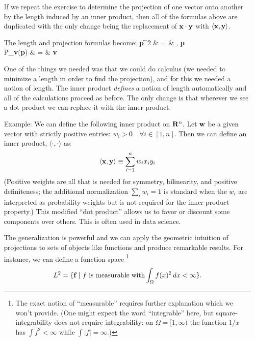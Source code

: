 \documentclass[12pt]{article}
\begin{document}
If we repeat the exercise to determine the projection of one vector onto 
another by the length induced by an inner product, then all of the 
formulas above are duplicated with the only change being the replacement 
of ${\bf x} \cdot {\bf y}$ with $\langle{\bf x}, {\bf y}\rangle$.

The length and projection formulas become:
\be
  \|{\bf p}\|^2 & = & , {\bf p} \rangle \\
  P_{\bf v}({\bf p}) & = &  {\bf v}
\ee

One of the things we needed was that we could do calculus
(we needed to minimize a length in order to find the projection),
and for this we needed a notion of length. The inner product {\em defines\/} 
a notion of length automatically and all of the calculations proceed as before.
The only change is that wherever we see a dot product we can replace it with 
the inner product.

Example: We can define the following inner product on ${\bf R}^n$.
Let ${\bf w}$ be a given vector with strictly positive entries:
$w_i > 0 \quad \forall i \in [1, n]$.
Then we can define an inner product, $\langle \cdot, \cdot \rangle$ as:
$$ \langle {\bf x}, {\bf y} \rangle \equiv \sum_{i=1}^n w_i x_i y_i$$
(Positive weights are all that is needed for symmetry, bilinearity, and
positive definiteness; the additional normalization $\sum_i w_i = 1$ is
standard when the $w_i$ are interpreted as probability weights but is
not required for the inner-product property.)
This modified ``dot product'' allows us to favor or discount some components
over others. This is often used in data science.

The generalization is powerful and we can apply the geometric intuition of 
projections to sets of objects like functions and 
produce remarkable results.
For instance, we can define a function space%
\footnote{The exact notion of ``measurable'' requires further
explanation which we won't provide.  (One might expect the word
``integrable'' here, but square-integrability does not require
integrability: on $\Omega = [1, \infty)$ the function $1/x$ has
$\int f^2 < \infty$ while $\int |f| = \infty$.)}
$$L^2 = \{ {\bf f} \mid \text{$f$ is measurable with} \int_\Omega f(x)^2 \, dx < \infty\}.$$
\end{document}

